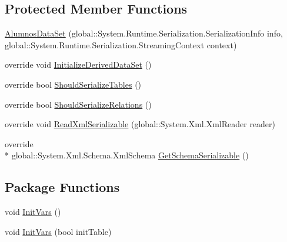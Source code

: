 \subsection*{Protected Member Functions}
\begin{DoxyCompactItemize}
\item 
\hyperlink{class_asistencias__wpf_1_1_alumnos_data_set_a8bb8ae3fc931cfd440b5829936be96da}{Alumnos\-Data\-Set} (global\-::\-System.\-Runtime.\-Serialization.\-Serialization\-Info info, global\-::\-System.\-Runtime.\-Serialization.\-Streaming\-Context context)
\item 
override void \hyperlink{class_asistencias__wpf_1_1_alumnos_data_set_aa54e430ba6cc29d1987e2aa2af9ae492}{Initialize\-Derived\-Data\-Set} ()
\item 
override bool \hyperlink{class_asistencias__wpf_1_1_alumnos_data_set_a7148e32c99b4bfa5fda209817ea3d5bc}{Should\-Serialize\-Tables} ()
\item 
override bool \hyperlink{class_asistencias__wpf_1_1_alumnos_data_set_a75d5276738807f69e3147ba9abbce54d}{Should\-Serialize\-Relations} ()
\item 
override void \hyperlink{class_asistencias__wpf_1_1_alumnos_data_set_a4dc0ff2efb9ba6bd71bd254fcd1e7ce9}{Read\-Xml\-Serializable} (global\-::\-System.\-Xml.\-Xml\-Reader reader)
\item 
override \\*
global\-::\-System.\-Xml.\-Schema.\-Xml\-Schema \hyperlink{class_asistencias__wpf_1_1_alumnos_data_set_adf60c84a546a7842987434eecdda8607}{Get\-Schema\-Serializable} ()
\end{DoxyCompactItemize}
\subsection*{Package Functions}
\begin{DoxyCompactItemize}
\item 
void \hyperlink{class_asistencias__wpf_1_1_alumnos_data_set_a4cd12c7d20f4d68d13a2845029bb7831}{Init\-Vars} ()
\item 
void \hyperlink{class_asistencias__wpf_1_1_alumnos_data_set_a4cefcbf11867b322bfa98ed9deddb8da}{Init\-Vars} (bool init\-Table)
\end{DoxyCompactItemize}
